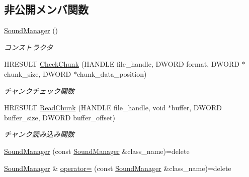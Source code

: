 \subsection*{非公開メンバ関数}
\begin{DoxyCompactItemize}
\item 
\mbox{\hyperlink{class_sound_manager_abcc1fbf3488be5788a42c9a4fe56df35}{Sound\+Manager}} ()
\begin{DoxyCompactList}\small\item\em コンストラクタ \end{DoxyCompactList}\item 
H\+R\+E\+S\+U\+LT \mbox{\hyperlink{class_sound_manager_a1f26a5ddca358c60772b40e99b181836}{Check\+Chunk}} (H\+A\+N\+D\+LE file\+\_\+handle, D\+W\+O\+RD format, D\+W\+O\+RD $\ast$chunk\+\_\+size, D\+W\+O\+RD $\ast$chunk\+\_\+data\+\_\+position)
\begin{DoxyCompactList}\small\item\em チャンクチェック関数 \end{DoxyCompactList}\item 
H\+R\+E\+S\+U\+LT \mbox{\hyperlink{class_sound_manager_a89826acbdcf32a9ec1110f3e805892e1}{Read\+Chunk}} (H\+A\+N\+D\+LE file\+\_\+handle, void $\ast$buffer, D\+W\+O\+RD buffer\+\_\+size, D\+W\+O\+RD buffer\+\_\+offset)
\begin{DoxyCompactList}\small\item\em チャンク読み込み関数 \end{DoxyCompactList}\item 
\mbox{\hyperlink{class_sound_manager_a64d6b47ad5f72114d2cae83b2ef7b350}{Sound\+Manager}} (const \mbox{\hyperlink{class_sound_manager}{Sound\+Manager}} \&class\+\_\+name)=delete
\item 
\mbox{\hyperlink{class_sound_manager}{Sound\+Manager}} \& \mbox{\hyperlink{class_sound_manager_a22fd4008f3e0c4f5e0e4480e3f89baed}{operator=}} (const \mbox{\hyperlink{class_sound_manager}{Sound\+Manager}} \&class\+\_\+name)=delete
\end{DoxyCompactItemize}
